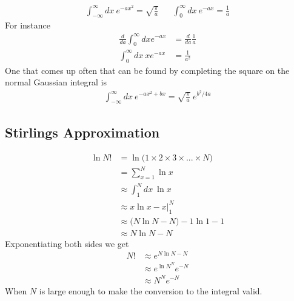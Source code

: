 \begin{align}
\int_{-\infty}^\infty dx ~e^{-ax^2} = \sqrt{\frac{\pi}{a}}
&&\int_0^\infty dx~e^{-a x} = \frac{1}{a}
\end{align}
For instance
\begin{align}
\frac{d}{da}\int_0^\infty dx e^{-a x} &= \frac{d}{da}\frac{1}{a}\\
\int_0^\infty dx~ x e^{-ax} &= \frac{1}{a^2}
\end{align}
One that comes up often that can be found by completing the square on the normal Gaussian integral is
\begin{align}
	\int_{-\infty}^\infty dx ~e^{-ax^2 + bx} = \sqrt{\frac{\pi}{a}}~e^{b^2/4a}
\end{align}


\subsection{Stirlings Approximation}
\begin{align}
\ln N! &= \ln \Big(1\times 2\times 3\times...\times N\Big)\\
&= \sum_{x=1}^N \ln x\\
&\approx \int_1^N dx~\ln x\\
&\approx x\ln x - x\Big|_1^N\\
&\approx \Big(N\ln N- N \Big) - 1\ln 1 - 1\\
&\approx N\ln N - N
\end{align}
Exponentiating both sides we get
\begin{align}
N! &\approx e^{N\ln N - N}\\
&\approx e^{\ln N^N}e^{-N}\\
&\approx N^Ne^{-N}
\end{align}
When $N$ is large enough to make the conversion to the integral valid.


